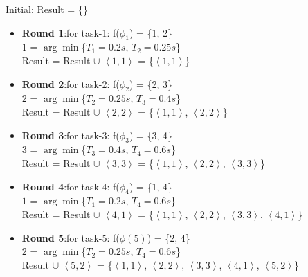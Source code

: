 \documentclass[conference]{IEEEtran}
\begin{document}
Initial: Result = \{\}
\begin{itemize}
	\item \textbf{Round 1}:for task-1:
	 f($\phi_1$) = \{1, 2\} \\
	 $1$ = $\arg\min$\{$T_1 = 0.2s$, $T_2 = 0.25s$\}\\
	Result = Result $\cup$ $\left \langle 1, 1\right \rangle$ = \{$\left \langle 1, 1\right \rangle$\}
	\item \textbf{Round 2}:for task-2:
	f($\phi_2$) = \{2, 3\}\\
	$2$ = $\arg\min$\{$T_2 = 0.25s$, $T_3 = 0.4s$\}\\
	Result = Result $\cup$ $\left \langle 2, 2\right \rangle$ = \{$\left \langle 1, 1\right \rangle$, $\left \langle 2, 2\right \rangle$\}
	\item \textbf{Round 3}:for task-3:
	f($\phi_3$) = \{3, 4\}\\
	$3$ = $\arg\min$\{$T_3 = 0.4s$, $T_4 = 0.6s$\}\\
	Result = Result $\cup$ $\left \langle 3, 3\right \rangle$ = \{$\left \langle 1, 1\right \rangle$, $\left \langle 2, 2\right \rangle$,  $\left \langle 3, 3\right \rangle$\}
	\item \textbf{Round 4}:for task  $4$:
	f($\phi_4$) = \{1, 4\}\\
	$1$ = $\arg\min$\{$T_1 = 0.2s$, $T_4 = 0.6s$\}\\
	Result = Result $\cup$ $\left \langle 4, 1\right \rangle$ = \{$\left \langle 1, 1\right \rangle$, $\left \langle 2, 2\right \rangle$,  $\left \langle 3, 3\right \rangle$, $\left \langle 4, 1\right \rangle$\}	
	\item \textbf{Round 5}:for task-5:
	f($\phi(5)$) = \{2, 4\}\\
	$2$ = $\arg\min$\{$T_2 = 0.25s$, $T_4 = 0.6s$\}\\
	Result $\cup$ $\left \langle 5, 2\right \rangle$ = \{$\left \langle 1, 1\right \rangle$, $\left \langle 2, 2\right \rangle$,  $\left \langle 3, 3\right \rangle$, $\left \langle 4, 1\right \rangle$, $\left \langle 5, 2\right \rangle$\}	
\end{itemize}
\end{document}
